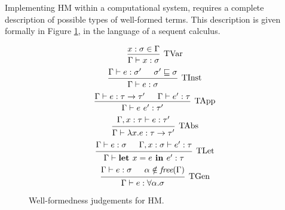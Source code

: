 \documentclass[../../Dissertation.tex]{subfiles}
\begin{document}
Implementing HM within a computational system, requires a complete description of possible types of well-formed terms. This description is given formally in Figure \ref{fig:HindleyMilner}, in the language of a sequent calculus.

\begin{figure}[H]
\begin{equation*}
  \begin{prooftree}
    \hypo{x : \sigma \in \Gamma}
    \infer1[TVar]{\Gamma \vdash x : \sigma}
  \end{prooftree}
\end{equation*}
\begin{equation*}
  \begin{prooftree}
    \hypo{\Gamma \vdash e : \sigma'}
    \hypo{\sigma' \sqsubseteq \sigma}
    \infer2[TInst]{\Gamma \vdash e : \sigma}
  \end{prooftree}
\end{equation*}
\begin{equation*}
  \begin{prooftree}
    \hypo{\Gamma \vdash e : \tau \rightarrow \tau'}
    \hypo{\Gamma \vdash e' : \tau}
    \infer2[TApp]{\Gamma \vdash e\ e' : \tau'}
  \end{prooftree}
\end{equation*}
\begin{equation*}
  \begin{prooftree}
    \hypo{\Gamma, x : \tau \vdash e : \tau'}
    \infer1[TAbs]{\Gamma \vdash \lambda x.e : \tau \rightarrow \tau'}
  \end{prooftree}
\end{equation*}
\begin{equation*} 
  \begin{prooftree}
    \hypo{\Gamma \vdash e : \sigma}
    \hypo{\Gamma, x : \sigma \vdash e' : \tau}
    \infer2[TLet]{\Gamma \vdash \textbf{let } x = e \textbf{ in } e' : \tau}
  \end{prooftree}
\end{equation*}
\begin{equation*}
  \begin{prooftree}
    \hypo{\Gamma \vdash e : \sigma}
    \hypo{\alpha \notin \textit{free}(\Gamma)}
    \infer2[TGen]{\Gamma \vdash e : \forall \alpha.\sigma}
  \end{prooftree}
\end{equation*}
\caption{Well-formedness judgements for HM.}
\label{fig:HindleyMilner}
\end{figure}
\end{document}
